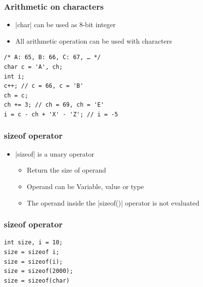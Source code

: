 \documentclass{../c-lecture}
\begin{document}
\begin{frame}[fragile]
  \frametitle{Arithmetic on characters}
  \begin{itemize}
    \item {}|char| can be used as 8-bit integer
    \item All arithmetic operation can be used with characters
  \end{itemize}
  \begin{verbatim}
/* A: 65, B: 66, C: 67, … */
char c = 'A', ch;
int i;
c++; // c = 66, c = 'B'
ch = c;
ch += 3; // ch = 69, ch = 'E'
i = c - ch + 'X' - 'Z'; // i = -5
  \end{verbatim}
\end{frame}

\begin{frame}
  \frametitle{sizeof operator}
  \begin{itemize}
    \item {}|sizeof| is a unary operator
    \begin{itemize}
      \item Return the size of operand
      \item Operand can be {\color{Cyan} Variable, value or type}
      \item The operand inside the |sizeof()| operator is not evaluated
    \end{itemize}
  \end{itemize}
\end{frame}

\begin{frame}[fragile]
  \frametitle{sizeof operator}
  \begin{verbatim}
int size, i = 10;
size = sizeof i;
size = sizeof(i);
size = sizeof(2000);
size = sizeof(char)
  \end{verbatim}
\end{frame}
\end{document}
